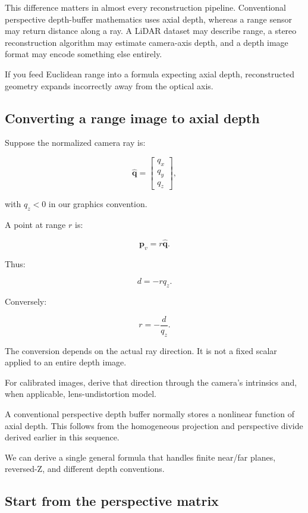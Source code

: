 This difference matters in almost every reconstruction pipeline. Conventional perspective depth-buffer mathematics uses axial depth, whereas a range sensor may return distance along a ray. A LiDAR dataset may describe range, a stereo reconstruction algorithm may estimate camera-axis depth, and a depth image format may encode something else entirely.

If you feed Euclidean range into a formula expecting axial depth, reconstructed geometry expands incorrectly away from the optical axis.

\subsection{Converting a range image to axial depth}\label{02-foundations-ii-ch035-converting-a-range-image-to-axial-depth}

\hypertarget{02-foundations-ii-ch035-converting-a-range-image-to-axial-depth}{}

Suppose the normalized camera ray is:

\[ \hat{\mathbf q}= \begin{bmatrix}q_x\\q_y\\q_z\end{bmatrix}, \]

with \(q_z<0\) in our graphics convention.

A point at range \(r\) is:

\[ \mathbf p_v=r\hat{\mathbf q}. \]

Thus:

\[ \boxed{d=-rq_z}. \]

Conversely:

\[ \boxed{r=-\frac d{q_z}}. \]

The conversion depends on the actual ray direction. It is not a fixed scalar applied to an entire depth image.

For calibrated images, derive that direction through the camera's intrinsics and, when applicable, lens-undistortion model.

A conventional perspective depth buffer normally stores a nonlinear function of axial depth. This follows from the homogeneous projection and perspective divide derived earlier in this sequence.

We can derive a single general formula that handles finite near/far planes, reversed-Z, and different depth conventions.

\subsection{Start from the perspective matrix}\label{02-foundations-ii-ch035-start-from-the-perspective-matrix}


